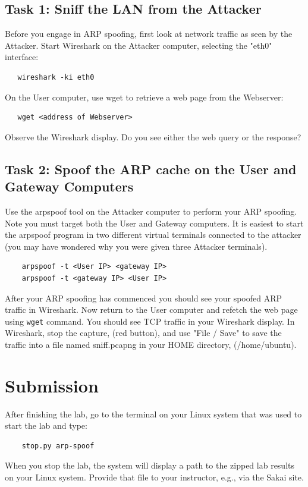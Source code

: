 \subsection{Task 1: Sniff the LAN from the Attacker}
Before you engage in ARP spoofing, first look at network traffic as seen by
the Attacker.
Start Wireshark on the Attacker computer, selecting the "eth0" interface:
\begin{verbatim}
   wireshark -ki eth0
\end{verbatim}

On the User computer, use wget to retrieve a web page from the Webserver:
\begin{verbatim}
   wget <address of Webserver>
\end{verbatim}

\noindent Observe the Wireshark display.  Do you see either the web query or the response?

\subsection{Task 2: Spoof the ARP cache on the User and Gateway Computers}
Use the arpspoof tool on the Attacker computer to perform your ARP spoofing.
Note you must target both the User and Gateway computers.  It is easiest to
start the arpspoof program in two different virtual terminals connected to the 
attacker (you may have wondered why you were given three Attacker terminals).

\begin{verbatim}
    arpspoof -t <User IP> <gateway IP>
    arpspoof -t <gateway IP> <User IP>
\end{verbatim}


After your ARP spoofing has commenced you should see your spoofed ARP traffic in Wireshark.
Now return to the User computer and refetch
the web page using {\tt wget} command.  You should see TCP traffic in your Wireshark
display.  In Wireshark, stop the capture, (red button), and use 
"File / Save" to save the traffic into a file named sniff.pcapng in your HOME directory,
(/home/ubuntu).

\section{Submission}
After finishing the lab, go to the terminal on your Linux system that was used to start the lab and type:
\begin{verbatim}
    stop.py arp-spoof
\end{verbatim}
When you stop the lab, the system will display a path to the zipped lab results on your Linux system.  Provide that file to 
your instructor, e.g., via the Sakai site.


